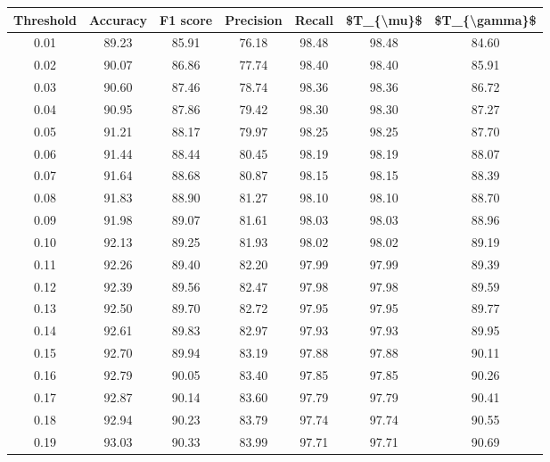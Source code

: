 \begin{tabular}{|c|c|c|c|c|c|c|}
\hline
 Threshold &  Accuracy &  F1 score &  Precision &  Recall &  \$T\_\{\textbackslash mu\}\$ &  \$T\_\{\textbackslash gamma\}\$ \\
\hline
      0.01 &     89.23 &     85.91 &      76.18 &   98.48 &      98.48 &         84.60 \\
      0.02 &     90.07 &     86.86 &      77.74 &   98.40 &      98.40 &         85.91 \\
      0.03 &     90.60 &     87.46 &      78.74 &   98.36 &      98.36 &         86.72 \\
      0.04 &     90.95 &     87.86 &      79.42 &   98.30 &      98.30 &         87.27 \\
      0.05 &     91.21 &     88.17 &      79.97 &   98.25 &      98.25 &         87.70 \\
      0.06 &     91.44 &     88.44 &      80.45 &   98.19 &      98.19 &         88.07 \\
      0.07 &     91.64 &     88.68 &      80.87 &   98.15 &      98.15 &         88.39 \\
      0.08 &     91.83 &     88.90 &      81.27 &   98.10 &      98.10 &         88.70 \\
      0.09 &     91.98 &     89.07 &      81.61 &   98.03 &      98.03 &         88.96 \\
      0.10 &     92.13 &     89.25 &      81.93 &   98.02 &      98.02 &         89.19 \\
      0.11 &     92.26 &     89.40 &      82.20 &   97.99 &      97.99 &         89.39 \\
      0.12 &     92.39 &     89.56 &      82.47 &   97.98 &      97.98 &         89.59 \\
      0.13 &     92.50 &     89.70 &      82.72 &   97.95 &      97.95 &         89.77 \\
      0.14 &     92.61 &     89.83 &      82.97 &   97.93 &      97.93 &         89.95 \\
      0.15 &     92.70 &     89.94 &      83.19 &   97.88 &      97.88 &         90.11 \\
      0.16 &     92.79 &     90.05 &      83.40 &   97.85 &      97.85 &         90.26 \\
      0.17 &     92.87 &     90.14 &      83.60 &   97.79 &      97.79 &         90.41 \\
      0.18 &     92.94 &     90.23 &      83.79 &   97.74 &      97.74 &         90.55 \\
      0.19 &     93.03 &     90.33 &      83.99 &   97.71 &      97.71 &         90.69 \\

\end{tabular}
